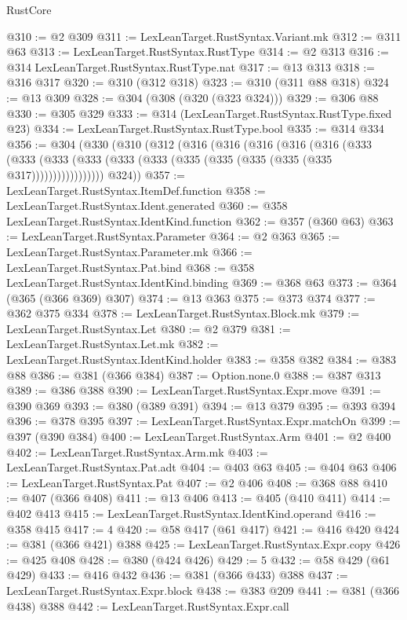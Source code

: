 \begin{lexlean}{RustCore}
\begin{coremodule}
@310 := @2 @309
@311 := LexLeanTarget.RustSyntax.Variant.mk
@312 := @311 @63
@313 := LexLeanTarget.RustSyntax.RustType
@314 := @2 @313
@316 := @314 LexLeanTarget.RustSyntax.RustType.nat
@317 := @13 @313
@318 := @316 @317
@320 := @310 (@312 @318)
@323 := @310 (@311 @88 @318)
@324 := @13 @309
@328 := @304 (@308 (@320 (@323 @324)))
@329 := @306 @88
@330 := @305 @329
@333 := @314 (LexLeanTarget.RustSyntax.RustType.fixed @23)
@334 := LexLeanTarget.RustSyntax.RustType.bool
@335 := @314 @334
@356 := @304
    (@330
      (@310
        (@312
          (@316
            (@316
              (@316
                (@316
                  (@316
                    (@333
                      (@333
                        (@333 (@333 (@333 (@333 (@335 (@335 (@335 (@335 (@335 @317)))))))))))))))))
        @324))
@357 := LexLeanTarget.RustSyntax.ItemDef.function
@358 := LexLeanTarget.RustSyntax.Ident.generated
@360 := @358 LexLeanTarget.RustSyntax.IdentKind.function
@362 := @357 (@360 @63)
@363 := LexLeanTarget.RustSyntax.Parameter
@364 := @2 @363
@365 := LexLeanTarget.RustSyntax.Parameter.mk
@366 := LexLeanTarget.RustSyntax.Pat.bind
@368 := @358 LexLeanTarget.RustSyntax.IdentKind.binding
@369 := @368 @63
@373 := @364 (@365 (@366 @369) @307)
@374 := @13 @363
@375 := @373 @374
@377 := @362 @375 @334
@378 := LexLeanTarget.RustSyntax.Block.mk
@379 := LexLeanTarget.RustSyntax.Let
@380 := @2 @379
@381 := LexLeanTarget.RustSyntax.Let.mk
@382 := LexLeanTarget.RustSyntax.IdentKind.holder
@383 := @358 @382
@384 := @383 @88
@386 := @381 (@366 @384)
@387 := Option.none.{0}
@388 := @387 @313
@389 := @386 @388
@390 := LexLeanTarget.RustSyntax.Expr.move
@391 := @390 @369
@393 := @380 (@389 @391)
@394 := @13 @379
@395 := @393 @394
@396 := @378 @395
@397 := LexLeanTarget.RustSyntax.Expr.matchOn
@399 := @397 (@390 @384)
@400 := LexLeanTarget.RustSyntax.Arm
@401 := @2 @400
@402 := LexLeanTarget.RustSyntax.Arm.mk
@403 := LexLeanTarget.RustSyntax.Pat.adt
@404 := @403 @63
@405 := @404 @63
@406 := LexLeanTarget.RustSyntax.Pat
@407 := @2 @406
@408 := @368 @88
@410 := @407 (@366 @408)
@411 := @13 @406
@413 := @405 (@410 @411)
@414 := @402 @413
@415 := LexLeanTarget.RustSyntax.IdentKind.operand
@416 := @358 @415
@417 := 4
@420 := @58 @417 (@61 @417)
@421 := @416 @420
@424 := @381 (@366 @421) @388
@425 := LexLeanTarget.RustSyntax.Expr.copy
@426 := @425 @408
@428 := @380 (@424 @426)
@429 := 5
@432 := @58 @429 (@61 @429)
@433 := @416 @432
@436 := @381 (@366 @433) @388
@437 := LexLeanTarget.RustSyntax.Expr.block
@438 := @383 @209
@441 := @381 (@366 @438) @388
@442 := LexLeanTarget.RustSyntax.Expr.call

\end{coremodule}
\end{lexlean}
